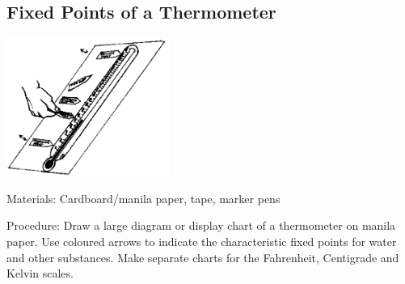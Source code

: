 \begin{multicols}{2}
\vfill
\columnbreak

\subsection{Fixed Points of a Thermometer}

\begin{center}
\includegraphics[width=0.4\textwidth]{./img/source/fixed-points.png}
\end{center}

\begin{description*}
\item[Materials:]{Cardboard/manila paper, tape, marker pens}
\item[Procedure:]{Draw a large diagram or display chart of a thermometer on manila paper. Use coloured arrows to indicate the characteristic fixed points for water and other substances. Make separate charts for the Fahrenheit, Centigrade and Kelvin scales.}
\end{description*}

\vfill
\pagebreak





\end{multicols}

